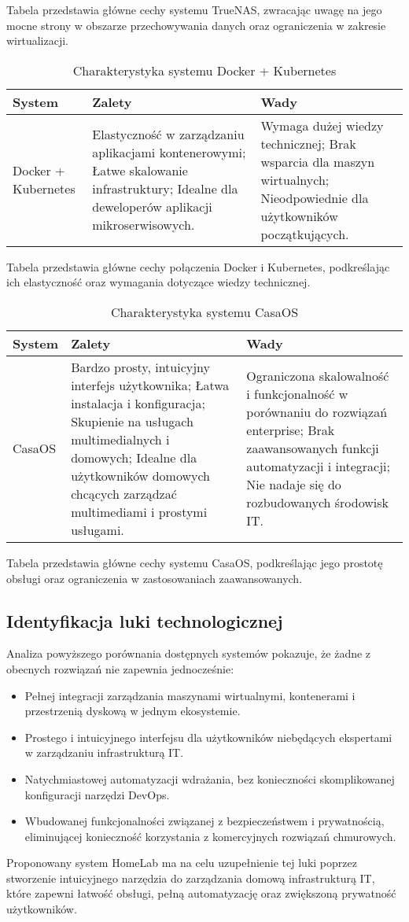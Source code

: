 Tabela przedstawia główne cechy systemu TrueNAS, zwracając uwagę na jego mocne strony w obszarze przechowywania danych oraz ograniczenia w zakresie wirtualizacji.

\begin{table}[H]
\centering
\begin{tabular}{|p{3cm}|p{6cm}|p{6cm}|}
\hline
\textbf{System} & \textbf{Zalety} & \textbf{Wady} \\
\hline
Docker + Kubernetes &
Elastyczność w zarządzaniu aplikacjami kontenerowymi; Łatwe skalowanie infrastruktury; Idealne dla deweloperów aplikacji mikroserwisowych. &
Wymaga dużej wiedzy technicznej; Brak wsparcia dla maszyn wirtualnych; Nieodpowiednie dla użytkowników początkujących. \\
\hline
\end{tabular}
\caption{Charakterystyka systemu Docker + Kubernetes}
\end{table}

Tabela przedstawia główne cechy połączenia Docker i Kubernetes, podkreślając ich elastyczność oraz wymagania dotyczące wiedzy technicznej.

\begin{table}[H]
\centering
\begin{tabular}{|p{3cm}|p{6cm}|p{6cm}|}
\hline
\textbf{System} & \textbf{Zalety} & \textbf{Wady} \\
\hline
CasaOS &
Bardzo prosty, intuicyjny interfejs użytkownika; Łatwa instalacja i konfiguracja; Skupienie na usługach multimedialnych i domowych; Idealne dla użytkowników domowych chcących zarządzać multimediami i prostymi usługami. &
Ograniczona skalowalność i funkcjonalność w porównaniu do rozwiązań enterprise; Brak zaawansowanych funkcji automatyzacji i integracji; Nie nadaje się do rozbudowanych środowisk IT. \\
\hline
\end{tabular}
\caption{Charakterystyka systemu CasaOS}
\end{table}

Tabela przedstawia główne cechy systemu CasaOS, podkreślając jego prostotę obsługi oraz ograniczenia w zastosowaniach zaawansowanych.

\subsection{Identyfikacja luki technologicznej}
Analiza powyższego porównania dostępnych systemów pokazuje, że żadne z obecnych rozwiązań nie zapewnia jednocześnie:
\begin{itemize}
    \item Pełnej integracji zarządzania maszynami wirtualnymi, kontenerami i przestrzenią dyskową w jednym ekosystemie.
    \item Prostego i intuicyjnego interfejsu dla użytkowników niebędących ekspertami w zarządzaniu infrastrukturą IT.
    \item Natychmiastowej automatyzacji wdrażania, bez konieczności skomplikowanej konfiguracji narzędzi DevOps.
    \item Wbudowanej funkcjonalności związanej z bezpieczeństwem i prywatnością, eliminującej konieczność korzystania z komercyjnych rozwiązań chmurowych.
\end{itemize}

Proponowany system HomeLab ma na celu uzupełnienie tej luki poprzez stworzenie intuicyjnego narzędzia do zarządzania domową infrastrukturą IT, które zapewni łatwość obsługi, pełną automatyzację oraz zwiększoną prywatność użytkowników.